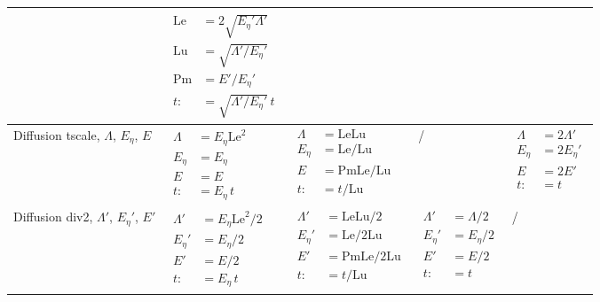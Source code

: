 \begin{table}[htbp]
\begin{tabular}[c]{p{2.5cm}|p{2.5cm}|p{2.5cm}|p{2.5cm}|p{2.5cm}}
    & $\begin{aligned}
        \mathrm{Le} &= 2\sqrt{E_\eta' \Lambda'} \\ 
        \mathrm{Lu} &= \sqrt{\Lambda' / E_\eta'} \\ 
        \mathrm{Pm} &= E'/E_\eta' \\
        t :&= \sqrt{\Lambda' / E_\eta'} \, t
    \end{aligned}$ \\
    \hline
    Diffusion tscale, $\Lambda$, $E_\eta$, $E$ 
    & $\begin{aligned}
        \Lambda &= E_\eta \mathrm{Le}^2 \\ 
        E_\eta &= E_\eta \\ 
        E &= E \\
        t :&= E_\eta \, t
    \end{aligned}$ 
    & $\begin{aligned}
        \Lambda &= \mathrm{Le} \mathrm{Lu} \\ 
        E_\eta &= \mathrm{Le} / \mathrm{Lu} \\ 
        E &= \mathrm{Pm} \mathrm{Le} / \mathrm{Lu} \\
        t :&= t/\mathrm{Lu}
    \end{aligned}$ & / 
    & $\begin{aligned}
        \Lambda &= 2\Lambda' \\ 
        E_\eta &= 2E_\eta' \\
        E &= 2E' \\
        t :&= t
    \end{aligned}$ \\
    \hline
    Diffusion div2, $\Lambda'$, $E_\eta'$, $E'$ 
    & $\begin{aligned}
        \Lambda' &= E_\eta \mathrm{Le}^2/2 \\ 
        E_\eta' &= E_\eta/2 \\ 
        E' &= E/2 \\
        t :&= E_\eta \, t
    \end{aligned}$ 
    & $\begin{aligned}
        \Lambda' &= \mathrm{Le} \mathrm{Lu}/2 \\ 
        E_\eta' &= \mathrm{Le} / 2\mathrm{Lu} \\ 
        E' &= \mathrm{Pm} \mathrm{Le} / 2\mathrm{Lu} \\
        t :&= t/\mathrm{Lu}
    \end{aligned}$ 
    & $\begin{aligned}
        \Lambda' &= \Lambda/2 \\ 
        E_\eta' &= E_\eta/2 \\
        E' &= E/2 \\
        t :&= t
    \end{aligned}$ & / \\
    \bottomrule
\end{tabular}
\end{table}

